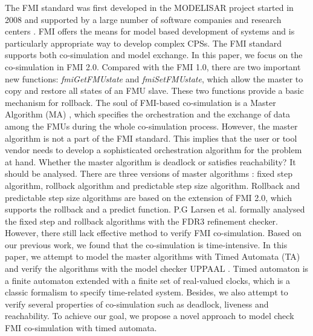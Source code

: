 The FMI standard was first developed in the MODELISAR project started in 2008 and supported by a large number of software companies and research centers \cite{ClauMODELISAR}. FMI offers the means for model based development of systems and is particularly appropriate way to develop complex CPSs. The FMI standard supports both co-simulation and  model exchange. In this paper, we focus on the co-simulation in FMI 2.0. Compared with the FMI 1.0, there are two important new functions: \emph{fmiGetFMUstate} and \emph{fmiSetFMUstate}, which allow the master to copy and restore all states of an FMU slave. These two functions provide a basic mechanism for rollback. The soul of FMI-based co-simulation is a Master Algorithm (MA) \cite{AckerDVM15}, which specifies the orchestration and the exchange of data among the FMUs during the whole co-simulation process. However, the master algorithm is not a part of the FMI standard. This implies that the user or tool vendor needs to develop a sophisticated orchestration algorithm for the problem at hand. Whether the master algorithm is deadlock or satisfies reachability? It should be analysed. There are three versions of master algorithms \cite{BromanBGLMTW13}: fixed step algorithm, rollback algorithm and predictable step size algorithm. Rollback and predictable step size algorithms are based on the extension of FMI 2.0, which supports the rollback and a predict function. P.G Larsen et al. \cite{Larsen2016Integrated} formally analysed the fixed step and rollback algorithms with the FDR3 refinement checker. However, there still lack effective method to verify FMI co-simulation. Based on our previous work, we found that the co-simulation is time-intensive. In this paper, we attempt to model the master algorithms with Timed Automata (TA) and verify the algorithms with the model checker UPPAAL \cite{BehrmannDLHPYH06}. Timed automaton is a finite automaton extended with a finite set of real-valued clocks, which is a classic formalism to specify time-related system. Besides, we also attempt to verify several properties of co-simulation such as deadlock, liveness and reachability. To achieve our goal, we propose a novel approach to model check FMI co-simulation with timed automata.

